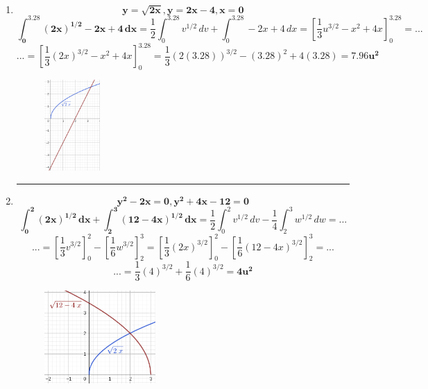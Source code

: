 \documentclass[12pt]{article}
\begin{document}
\begin{itemize}
\begin{enumerate}
                \newpage\hrule
                \item \[\bm{y = \sqrt{2x}, y = 2x - 4, x = 0}\]
                    \[\bm{\int_{0}^{3.28} (2x)^{1/2} - 2x + 4 \, dx} = \frac{1}{2}\int_{0}^{3.28} v^{1/2} \, dv + \int_{0}^{3.28} - 2x + 4 \, dx = \left[\frac{1}{3}u^{3/2} - x^2 + 4x\right]_{0}^{3.28} = ...\]
                    \[... =  \left[\frac{1}{3}(2x)^{3/2} - x^2 + 4x\right]_{0}^{3.28} = \frac{1}{3}(2(3.28))^{3/2} - (3.28)^2 + 4(3.28) = \bm{7.96u^2}\]
                    \begin{figure}[h!]
                        \centering
                        \includegraphics[width=0.2\textwidth]{img/t6-ej2-5.png}
                    \end{figure}

                \hrule
                \item \[\bm{y^2 - 2x = 0, y^2 + 4x - 12 = 0}\]
                    \[\bm{\int_{0}^{2} (2x)^{1/2} \, dx + \int_{2}^{3} (12 - 4x)^{1/2} \, dx} = \frac{1}{2}\int_{0}^{2} v^{1/2} \, dv - \frac{1}{4}\int_{2}^{3} w^{1/2} \, dw =...\]
                    \[... = \left[\frac{1}{3} v^{3/2}\right]_{0}^{2} - \left[\frac{1}{6} w^{3/2}\right]_{2}^{3} =  \left[\frac{1}{3} (2x)^{3/2}\right]_{0}^{2} - \left[\frac{1}{6} (12 - 4x)^{3/2}\right]_{2}^{3} = ...\]
                    \[... = \frac{1}{3}(4)^{3/2} + \frac{1}{6}(4)^{3/2} =  \bm{4u^2}\]
                    \begin{figure}[h!]
                        \centering
                        \includegraphics[width=0.4\textwidth]{img/t6-ej2-6.png}
                    \end{figure}


\end{enumerate}
\end{itemize}
\end{document}
